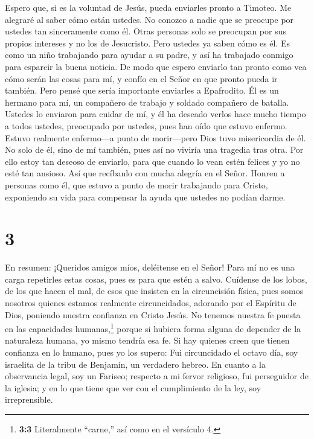  Espero que, si es la voluntad de Jesús, pueda enviarles
pronto a Timoteo. Me alegraré al saber cómo están ustedes. 
No conozco a nadie que se preocupe por ustedes tan sinceramente como él.
 Otras personas solo se preocupan por sus propios intereses
y no los de Jesucristo.  Pero ustedes ya saben cómo es él.
Es como un niño trabajando para ayudar a su padre, y así ha trabajado
conmigo para esparcir la buena noticia.  De modo que espero
enviarlo tan pronto como vea cómo serán las cosas para mí, 
y confío en el Señor en que pronto pueda ir también.  Pero
pensé que sería importante enviarles a Epafrodito. Él es un hermano para
mí, un compañero de trabajo y soldado compañero de batalla. Ustedes lo
enviaron para cuidar de mí,  y él ha deseado verlos hace
mucho tiempo a todos ustedes, preocupado por ustedes, pues han oído que
estuvo enfermo.  Estuvo realmente enfermo---a punto de
morir---pero Dios tuvo misericordia de él. No solo de él, sino de mí
también, pues así no viviría una tragedia tras otra.  Por
ello estoy tan deseoso de enviarlo, para que cuando lo vean estén
felices y yo no esté tan ansioso.  Así que recíbanlo con
mucha alegría en el Señor. Honren a personas como él,  que
estuvo a punto de morir trabajando para Cristo, exponiendo su vida para
compensar la ayuda que ustedes no podían darme.

\hypertarget{section-2}{%
\section{3}\label{section-2}}

 En resumen: ¡Queridos amigos míos, deléitense en el Señor!
Para mí no es una carga repetirles estas cosas, pues es para que estén a
salvo.  Cuídense de los lobos, de los que hacen el mal, de
esos que insisten en la circuncisión física,  pues somos
nosotros quienes estamos realmente circuncidados, adorando por el
Espíritu de Dios, poniendo nuestra confianza en Cristo Jesús. No tenemos
nuestra fe puesta en las capacidades humanas,\footnote{\textbf{3:3}
  Literalmente ``carne,'' así como en el versículo 4.} 
porque si hubiera forma alguna de depender de la naturaleza humana, yo
mismo tendría esa fe. Si hay quienes creen que tienen confianza en lo
humano, pues yo los supero:  Fui circuncidado el octavo día,
soy israelita de la tribu de Benjamín, un verdadero hebreo. En cuanto a
la observancia legal, soy un Fariseo;  respecto a mi fervor
religioso, fui perseguidor de la iglesia; y en lo que tiene que ver con
el cumplimiento de la ley, soy irreprensible.

